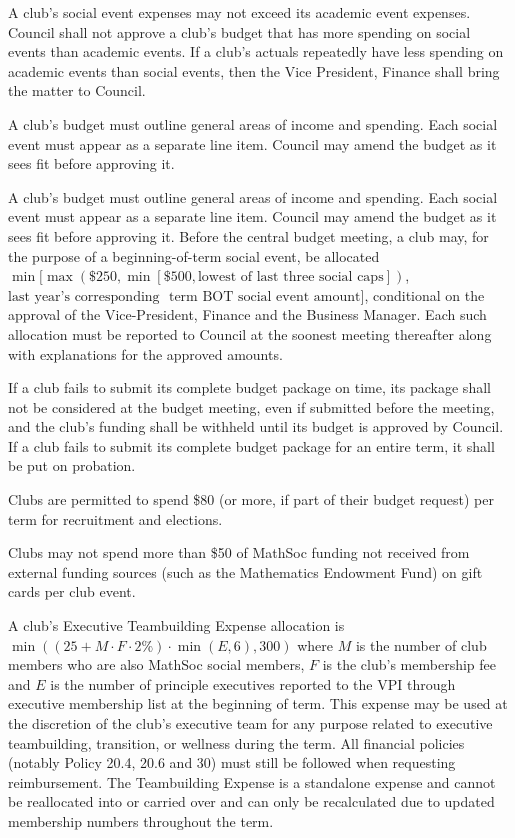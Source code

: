 A club's social event expenses may not exceed its academic event expenses.
Council shall not approve a club's budget that has more spending on social
events than academic events. If a club's actuals repeatedly have less spending
on academic events than social events, then the Vice President, Finance shall
bring the matter to Council.


A club's budget must outline general areas of income and spending. Each social
event must appear as a separate line item. Council may amend the budget as it
sees fit before approving it.

A club’s budget must outline general areas of income and spending. Each social event must appear as a separate line item. Council may amend the budget as it sees fit before approving it. Before the central budget meeting, a club may, for the purpose of a beginning-of-term social event, be allocated $\min[\max(\$250, \min[\$500, \text{lowest of last three social caps}])$, $\text{last year's corresponding }$ $\text{term BOT social event amount}]$, conditional on the approval of the Vice-President, Finance and the Business Manager. Each such allocation must be reported to Council at the soonest meeting thereafter along with explanations for the approved amounts. 

If a club fails to submit its complete budget package on time, its package shall
not be considered at the budget meeting, even if submitted before the meeting,
and the club's funding shall be withheld until its budget is approved by
Council. If a club fails to submit its complete budget package for an entire
term, it shall be put on probation.

Clubs are permitted to spend \$80 (or more, if part of their budget request) per
term for recruitment and elections.

Clubs may not spend more than \$50 of MathSoc funding not received from external funding sources (such as the Mathematics Endowment Fund) on gift cards per club event.

A club’s Executive Teambuilding Expense allocation is $\min((25+M\cdot F\cdot 2\%)\cdot \min(E,6), 300)$ where $M$ is the number of club members who are also MathSoc social members, $F$ is the club’s membership fee and $E$ is the number of principle executives reported to the VPI through executive membership list at the beginning of term. This expense may be used at the discretion of the club’s executive team for any purpose related to executive teambuilding, transition, or wellness during the term. All financial policies (notably Policy 20.4, 20.6 and 30) must still be followed when requesting reimbursement. The Teambuilding Expense is a standalone expense and cannot be reallocated into or carried over and can only be recalculated due to updated membership numbers throughout the term.

